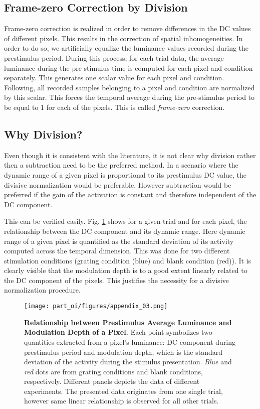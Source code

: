 \subsection{Frame-zero Correction by Division}


Frame-zero correction is realized in order to remove differences in the DC
values of different pixels. This results in the correction of spatial
inhomogeneities. In order to do so, we artificially equalize the luminance
values recorded during the prestimulus period. During this process, for
each trial data, the average luminance during the pre-stimulus time is
computed for each pixel and condition separately. This generates one scalar
value \newpage for each pixel and condition. Following, all recorded samples
belonging to a pixel and condition are normalized by this scalar. This
forces the temporal average during the pre-stimulus period to be equal to 1
for each of the pixels. This is called \textit{frame-zero} correction. 

\subsection{Why Division?} 

Even though it is consistent with the literature, it is not clear why
division rather then a subtraction need to be the preferred method. In a
scenario where the dynamic range of a given pixel is proportional to its
prestimulus DC value, the divisive normalization would be preferable.
However subtraction would be preferred if the gain of the activation is
constant and therefore independent of the DC component. 

This can be verified easily. Fig. \ref{why} shows for a given trial and for
each pixel, the relationship between the DC component and its dynamic
range. Here dynamic range of a given pixel is quantified as the standard
deviation of its activity computed across the temporal dimension. This was
done for two different stimulation conditions (grating condition (blue) and
blank condition (red)). It is clearly visible that the modulation depth is
to a good extent linearly related to the DC component of the pixels. This
justifies the necessity for a divisive normalization procedure. 

\begin{figure}[!h] \centerline{
\texttt{[image: part\_oi/figures/appendix\_03.png]}}
\caption[Relationship between Prestimulus Average Luminance and Modulation
Depth of a Pixel.]{\textbf{Relationship between Prestimulus Average
Luminance and Modulation Depth of a Pixel.} Each point symbolizes two
quantities extracted from a pixel's luminance: DC component during
prestimulus period and modulation depth, which is the standard deviation of
the activity during the stimulus presentation. \textit{Blue} and
\textit{red} dots are from grating conditions and blank conditions,
respectively. Different panels depicts the data of different experiments.
The presented data originates from one single trial, however same linear
relationship is observed for all other trials.}

\label{why}

\end{figure}

